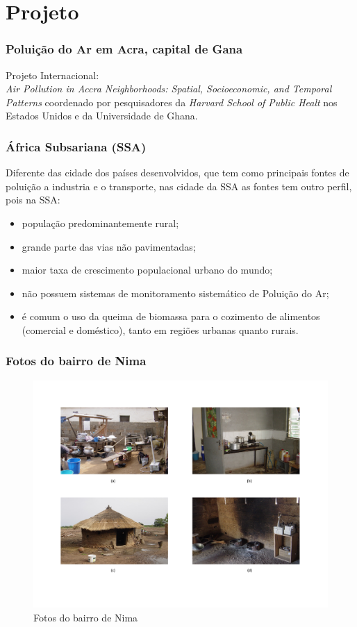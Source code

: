 \section{Projeto}

\begin{frame}
  \frametitle{Poluição do Ar em Acra, capital de Gana}
  Projeto Internacional: \\
  \textit{Air Pollution in Accra Neighborhoods: Spatial, Socioeconomic, and Temporal Patterns} 
  coordenado por pesquisadores da \textit{Harvard School of Public Healt} nos Estados Unidos
  e da Universidade de Ghana.
\end{frame}

\begin{frame}
 \frametitle{ África Subsariana (SSA)}
  Diferente das cidade dos países desenvolvidos, que tem como principais fontes de poluição 
  a industria e o transporte, nas cidade da SSA as fontes tem outro perfil, pois na SSA:
  \begin{itemize}
    \item população predominantemente rural;
    \item grande parte das vias não pavimentadas;
    \item maior taxa de crescimento populacional urbano do mundo;
    \item não possuem sistemas de monitoramento sistemático de Poluição do Ar;
    \item é comum o uso da queima de biomassa para o cozimento de alimentos (comercial e doméstico), tanto em regiões urbanas quanto rurais.
  \end{itemize}
\end{frame}

\begin{frame}
  \frametitle{Fotos do bairro de Nima}
  \begin{figure}[H]
    \centering
    \caption{Fotos do bairro de Nima}
    \includegraphics[scale=0.3]{../../../inputs/images/zheng/nima.pdf}
  \end{figure}
\end{frame}

